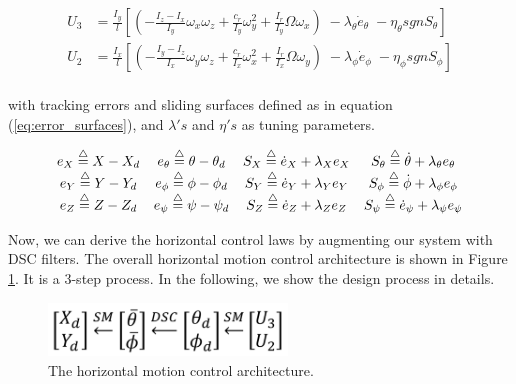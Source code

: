 \documentclass[journal,11pt,onecolumn,draftclsnofoot,]{IEEEtran}
\begin{document}
\begin{equation}
\label{eq:U2_3}
\begin{split}
U_3 &= \frac{I_y}{l}\left[ \left( -\frac{I_z-I_x}{I_y} \omega_x \omega_z + \frac{c_r}{I_y} \omega_y^2 + \frac{I_r}{I_y} \Omega \omega_x \right)\; - \lambda_\theta \dot{e}_\theta \; - \eta_\theta sgn S_\theta \right] \\
U_2 &= \frac{I_x}{l}\left[ \left( -\frac{I_y-I_z}{I_x} \omega_y \omega_z + \frac{c_r}{I_x} \omega_x^2 + \frac{I_r}{I_x} \Omega \omega_y \right)\; - \lambda_\phi \dot{e}_\phi \; - \eta_\phi sgn S_\phi \right] \\
\end{split}
\end{equation}

with tracking errors and sliding surfaces defined as in equation (\ref{eq:error_surfaces}), and $\lambda's$ and $\eta's$ as tuning parameters.

\begin{equation}
\label{eq:error_surfaces}
\begin{split}
\begin{matrix}
e_X \buildrel\triangle\over = X-X_d  & e_\theta \buildrel\triangle\over = \theta - \theta_d & S_X \buildrel\triangle\over = \dot{e}_X + \lambda_X e_X & S_\theta \buildrel\triangle\over = \dot{\theta} + \lambda_\theta e_\theta \\
e_Y \buildrel\triangle\over = Y-Y_d & e_\phi \buildrel\triangle\over = \phi - \phi_d  & S_Y \buildrel\triangle\over = \dot{e}_Y + \lambda_Y e_Y & S_\phi \buildrel\triangle\over = \dot{\phi} + \lambda_\phi e_\phi \\
e_Z \buildrel\triangle\over = Z-Z_d & e_\psi \buildrel\triangle\over = \psi-\psi_d & S_Z \buildrel\triangle\over = \dot{e}_Z + \lambda_Z e_Z & S_\psi \buildrel\triangle\over = \dot{e}_\psi + \lambda_\psi e_\psi \\
\end{matrix}
\end{split}
\end{equation}

Now, we can derive the horizontal control laws by augmenting our system with DSC filters. The overall horizontal motion control architecture is shown in Figure \ref{fig:horiz_ctrls}. It is a 3-step process. In the following, we show the design process in details.

\begin{figure}[thpb]
	\centering
	\includegraphics[width=2.5in]{horiz_ctrl}
	\caption{The horizontal motion control architecture.}
	\label{fig:horiz_ctrls}
\end{figure}
\end{document}
